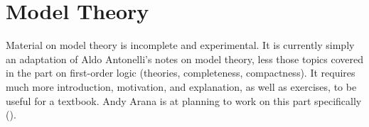 \documentclass[../../include/open-logic-part]{subfiles}
\begin{document}
\part{Model Theory}

\begin{editorial}
  Material on model theory is incomplete and experimental.  It is
  currently simply an adaptation of Aldo Antonelli's notes on model
  theory, less those topics covered in the part on first-order logic
  (theories, completeness, compactness).  It requires much more
  introduction, motivation, and explanation, as well as exercises, to
  be useful for a textbook.  Andy Arana is at planning to work on this
  part specifically ().
\end{editorial}




\OLEndPartHook
\end{document}
